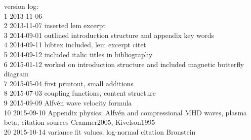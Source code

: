 \vfill

\begin{footnotesize}
\noindent version log:\\
1	2013-11-06\\
2	2013-11-07	inserted lem excerpt\\
3	2014-09-01	outlined introduction structure and appendix key words\\
4	2014-09-11	bibtex included, lem excerpt citet\\
5	2014-09-12	included italic titles in bibliography\\
6	2015-01-12	worked on introduction structure and included magnetic butterfly diagram\\
7	2015-05-04	first printout, small additions\\
8	2015-07-03	coupling functions, content structure\\
9	2015-09-09	Alfv\'en wave velocity formula\\
10	2015-09-10	Appendix physics: Alfv\'en and compressional MHD waves, plasma beta; citation sources Cranmer2005, Kivelson1995\\
20	2015-10-14	variance fit values; log-normal citation Bronstein\\

\end{footnotesize}
